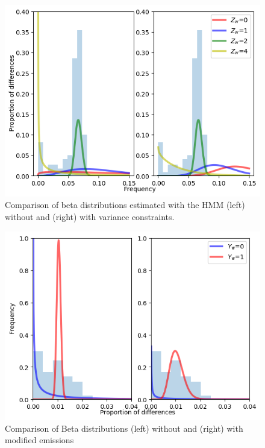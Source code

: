 \documentclass[12pt, letterpaper]{article}
\begin{document}
\begin{figure}[h!]
    \includegraphics[width=18cm]{supplementary_info/plots/contam0_inbred1_run57_coverage0.2_asc0_inputMode_hapProbs_fil0_pair0_15_relid_betaplot.png}
    \centering
    \caption{Comparison of beta distributions estimated with the HMM (left) without and (right) with variance constraints.}
    \label{figS4:bndsbeta}
\end{figure}


\begin{figure}[h!]
    \includegraphics[width=18cm]{supplementary_info/plots/contam0_inbred1_run57_coverage0.2_asc0_inputMode_hapProbs_fil0_ind0_forced_roh.png}
     \centering
    \caption{Comparison of Beta distributions (left) without and (right) with modified emissions}
    \label{figS5:ROHforced}
\end{figure}
\end{document}
